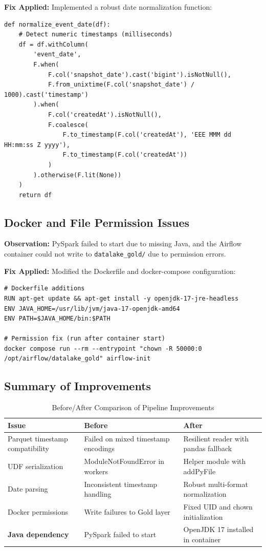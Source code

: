 \documentclass[12pt]{article}
\begin{document}
\textbf{Fix Applied:} Implemented a robust date normalization function:

\begin{lstlisting}[caption=Date Normalization Logic]
def normalize_event_date(df):
    # Detect numeric timestamps (milliseconds)
    df = df.withColumn(
        'event_date',
        F.when(
            F.col('snapshot_date').cast('bigint').isNotNull(),
            F.from_unixtime(F.col('snapshot_date') / 1000).cast('timestamp')
        ).when(
            F.col('createdAt').isNotNull(),
            F.coalesce(
                F.to_timestamp(F.col('createdAt'), 'EEE MMM dd HH:mm:ss Z yyyy'),
                F.to_timestamp(F.col('createdAt'))
            )
        ).otherwise(F.lit(None))
    )
    return df
\end{lstlisting}

\subsection{Docker and File Permission Issues}

\textbf{Observation:} PySpark failed to start due to missing Java, and the Airflow container could not write to \texttt{datalake\_gold/} due to permission errors.

\textbf{Fix Applied:} Modified the Dockerfile and docker-compose configuration:

\begin{lstlisting}[caption=Dockerfile Additions for PySpark]
# Dockerfile additions
RUN apt-get update && apt-get install -y openjdk-17-jre-headless
ENV JAVA_HOME=/usr/lib/jvm/java-17-openjdk-amd64
ENV PATH=$JAVA_HOME/bin:$PATH

# Permission fix (run after container start)
docker compose run --rm --entrypoint "chown -R 50000:0 /opt/airflow/datalake_gold" airflow-init
\end{lstlisting}

\subsection{Summary of Improvements}

\begin{table}[H]
\centering
\caption{Before/After Comparison of Pipeline Improvements}
\label{tab:improvements}
\begin{tabular}{p{4cm}p{4cm}p{4cm}}
\toprule
\textbf{Issue} & \textbf{Before} & \textbf{After} \\
\midrule
Parquet timestamp compatibility & Failed on mixed timestamp encodings & Resilient reader with pandas fallback \\
UDF serialization & ModuleNotFoundError in workers & Helper module with addPyFile \\
Date parsing & Inconsistent timestamp handling & Robust multi-format normalization \\
Docker permissions & Write failures to Gold layer & Fixed UID and chown initialization \\
\textbf{Java dependency} & PySpark failed to start & OpenJDK 17 installed in container \\
\bottomrule
\end{tabular}
\end{table}
\end{document}
